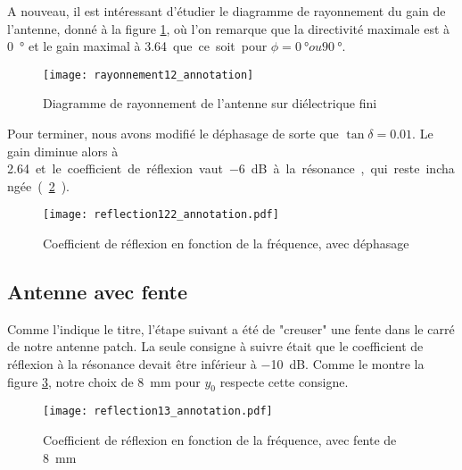 A nouveau, il est intéressant d'étudier le diagramme de rayonnement du gain de l'antenne, donné à la figure \ref{fig:rayonnement12_annotation}, où l'on remarque que la directivité maximale est à  \SI{0}{\degree} et le gain maximal à \SI{3.64} que ce soit pour $\phi = \SI{0}{\degree} ou  \SI{90}{\degree}$.
\begin{figure}
\centering
\texttt{[image: rayonnement12\_annotation]}
\caption{Diagramme de rayonnement de l'antenne sur diélectrique fini}
\label{fig:rayonnement12_annotation}
\end{figure}
Pour terminer, nous avons modifié le déphasage de sorte que $\tan{\delta} = 0.01$. Le gain diminue alors à \SI{2.64} et le coefficient de réflexion vaut \SI{-6}{\deci\bel} à la résonance, qui reste inchangée. (\ref{fig:reflection122_annotation}).
\begin{figure}[htbp]
\centering
\texttt{[image: reflection122\_annotation.pdf]}
\caption{Coefficient de réflexion en fonction de la fréquence, avec déphasage}
\label{fig:reflection122_annotation}
\end{figure}


\subsection{Antenne avec fente}
Comme l'indique le titre, l'étape suivant a été de "creuser" une fente dans le carré de notre antenne patch. La seule consigne à suivre était que le coefficient de réflexion à la résonance devait être inférieur à \SI{-10}{\deci\bel}. Comme le montre la figure \ref{fig:reflection13_annotation}, notre choix de \SI{8}{\milli\meter} pour $y_0$ respecte cette consigne.
\begin{figure}[htbp]
\centering
\texttt{[image: reflection13\_annotation.pdf]}
\caption{Coefficient de réflexion en fonction de la fréquence, avec fente de \SI{8}{\milli\meter}}
\label{fig:reflection13_annotation}
\end{figure}

